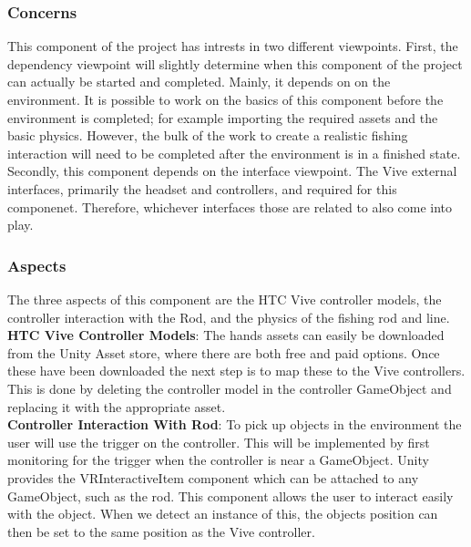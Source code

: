 \documentclass[10pt,journal,compsoc,onecolumn, draftclsnofoot]{IEEEtran}
\begin{document}
\subsubsection{Concerns}
This component of the project has intrests in two different viewpoints.
First, the dependency viewpoint will slightly determine when this component of the project can actually be started and completed.
Mainly, it depends on on the environment.
It is possible to work on the basics of this component before the environment is completed; for example importing the required assets and the basic physics.
However, the bulk of the work to create a realistic fishing interaction will need to be completed after the environment is in a finished state.
Secondly, this component depends on the interface viewpoint.
The Vive external interfaces, primarily the headset and controllers, and required for this componenet.
Therefore, whichever interfaces those are related to also come into play.

\subsubsection{Aspects}
The three aspects of this component are the HTC Vive controller models, the controller interaction with the Rod, and the physics of the fishing rod and line.\\

\hangindent=0.5cm \textbf{HTC Vive Controller Models}: The hands assets can easily be downloaded from the Unity Asset store, where there are both free and paid options.
Once these have been downloaded the next step is to map these to the Vive controllers.
This is done by deleting the controller model in the controller GameObject and replacing it with the appropriate asset.\\

\hangindent=0.5cm \textbf{Controller Interaction With Rod}: To pick up objects in the environment the user will use the trigger on the controller.
This will be implemented by first monitoring for the trigger when the controller is near a GameObject.
Unity provides the VRInteractiveItem component which can be attached to any GameObject, such as the rod.\cite{unity_controller_interaction}
This component allows the user to interact easily with the object.
When we detect an instance of this, the objects position can then be set to the same position as the Vive controller.\\
\end{document}
